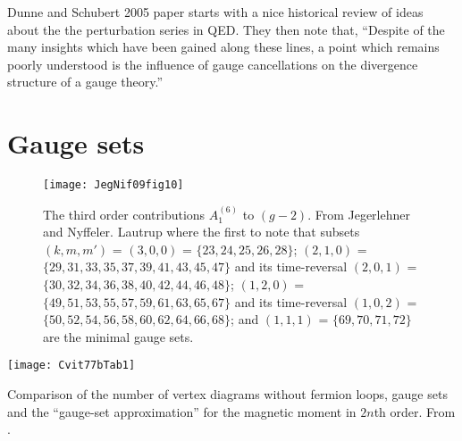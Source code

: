 \newpage

Dunne and Schubert 2005 paper
starts with a nice historical review of ideas about the the perturbation
series in QED. They then note that,
``Despite of the many insights which have been gained along these lines,
a point which remains poorly understood is the influence of gauge
cancellations on the divergence structure of a gauge theory.''

\section{Gauge sets}
\label{sect:finitness}

\begin{figure}
\begin{center}
\texttt{[image: JegNif09fig10]}
\end{center}
\caption{\label{JegNif09fig10}
The third order contributions $A^{(6)}_1$ to $(g-2)$.
From Jegerlehner and Nyffeler.
Lautrup \etal{} where the first to note that
subsets $(k,m,m')$ =
$(3,0,0)$ = $\{23,24,25,26,28\}$;
$(2,1,0)$ = $\{29,31,33,35,37,39,41,43,45,47\}$ and its time-reversal
$(2,0,1)$ = $\{30,32,34,36,38,40,42,44,46,48\}$;
$(1,2,0)$ = $\{49,51,53,55,57,59,61,63,65,67\}$ and its time-reversal
$(1,0,2)$ = $\{50,52,54,56,58,60,62,64,66,68\}$;
and
$(1,1,1)$ = $\{69,70,71,72\}$
are the minimal gauge sets.
}
 \end{figure}

\begin{table}
\begin{center}
\texttt{[image: Cvit77bTab1]}
\end{center}
\caption{\label{Cvit77bTab1}
Comparison of the number of vertex diagrams without fermion loops, gauge
sets and the ``gauge-set approximation'' for the magnetic moment in
$2n$th order.
From .
}
\end{table}

